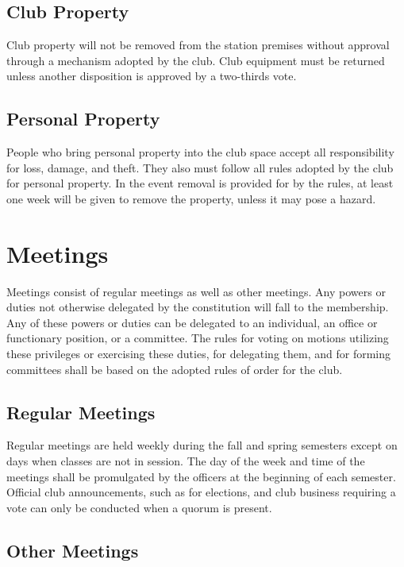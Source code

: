 \documentclass{article}
\begin{document}
\subsection{Club Property}

Club property will not be removed from the station premises without approval
through a mechanism adopted by the club. Club equipment must be returned unless
another disposition is approved by a two-thirds vote.

\subsection{Personal Property}

People who bring personal property into the club space accept all responsibility
for loss, damage, and theft. They also must follow all rules adopted by the club
for personal property. In the event removal is provided for by the rules, at
least one week will be given to remove the property, unless it may pose a
hazard.

\section{Meetings}

Meetings consist of regular meetings as well as other meetings. Any powers or
duties not otherwise delegated by the constitution will fall to the membership.
Any of these powers or duties can be delegated to an individual, an office or
functionary position, or a committee. The rules for voting on motions utilizing
these privileges or exercising these duties, for delegating them, and for
forming committees shall be based on the adopted rules of order for the club.

\subsection{Regular Meetings}

Regular meetings are held weekly during the fall and spring semesters except on
days when classes are not in session. The day of the week and time of the
meetings shall be promulgated by the officers at the beginning of each semester.
Official club announcements, such as for elections, and club business requiring
a vote can only be conducted when a quorum is present.

\subsection{Other Meetings}
\end{document}
